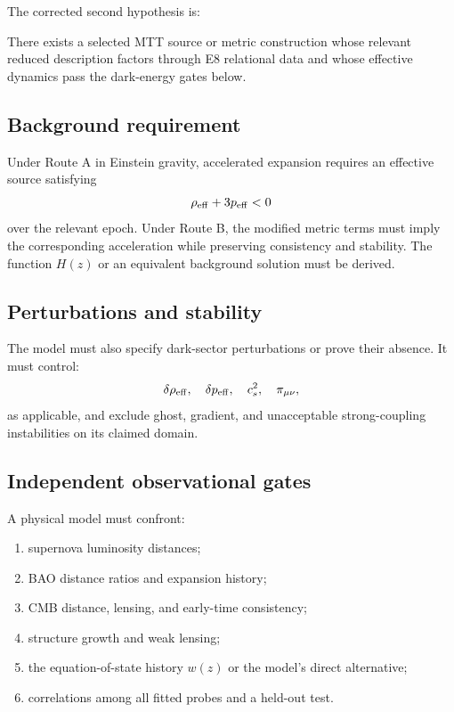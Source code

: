 \documentclass[11pt]{article}
\begin{document}
The corrected second hypothesis is:

\begin{conjecture}
\label{conj:de}
There exists a selected MTT source or metric construction whose relevant
reduced description factors through E8 relational data and whose effective
dynamics pass the dark-energy gates below.
\end{conjecture}

\subsection{Background requirement}

Under Route A in Einstein gravity, accelerated expansion requires an effective
source satisfying
\[
\rho_{\rm eff}+3p_{\rm eff}<0
\]
over the relevant epoch.  Under Route B, the modified metric terms must imply
the corresponding acceleration while preserving consistency and stability.
The function $H(z)$ or an equivalent background solution must be derived.

\subsection{Perturbations and stability}

The model must also specify dark-sector perturbations or prove their absence.
It must control:
\[
\delta\rho_{\rm eff},\quad
\delta p_{\rm eff},\quad
c_s^2,\quad
\pi_{\mu\nu},
\]
as applicable, and exclude ghost, gradient, and unacceptable strong-coupling
instabilities on its claimed domain.

\subsection{Independent observational gates}

A physical model must confront:
\begin{enumerate}[label=\textbf{DE\arabic*.}]
\item supernova luminosity distances;
\item BAO distance ratios and expansion history;
\item CMB distance, lensing, and early-time consistency;
\item structure growth and weak lensing;
\item the equation-of-state history $w(z)$ or the model's direct alternative;
\item correlations among all fitted probes and a held-out test.
\end{enumerate}
\end{document}
